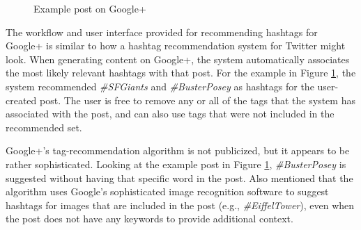 \documentclass[man,floatsintext,donotrepeattitle]{apa6}
\begin{document}
\begin{figure}[!htbp]
  \caption{Example post on Google+}
  \label{figGoogle+Hashtags}
\end{figure}

The workflow and user interface provided for recommending hashtags for Google+ is similar to how a hashtag recommendation system for Twitter might look.
When generating content on Google+, the system automatically associates the most likely relevant hashtags with that post.
For the example in Figure \ref{figGoogle+Hashtags}, the system recommended \emph{\#SFGiants} and \emph{\#BusterPosey} as hashtags for the user-created post.
The user is free to remove any or all of the tags that the system has associated with the post, and can also use tags that were not included in the recommended set.

Google+'s tag-recommendation algorithm is not publicized, but it appears to be rather sophisticated.
Looking at the example post in Figure \ref{figGoogle+Hashtags}, \emph{\#BusterPosey} is suggested without having that specific word in the post.
Also \textcite{GoogleKeynote2013} mentioned that the algorithm uses Google's sophisticated image recognition software to suggest hashtags for images that are included in the post (e.g., \emph{\#EiffelTower}),
even when the post does not have any keywords to provide additional context.
\end{document}
